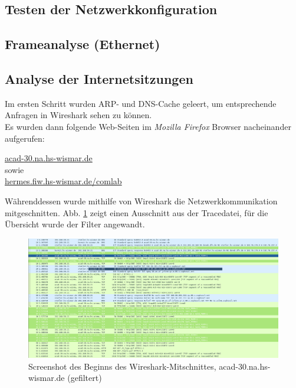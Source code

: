 \documentclass[11pt, a4paper]{article}
\begin{document}
\subsection{Testen der Netzwerkkonfiguration}


\subsection{Frameanalyse (Ethernet)}


\subsection{Analyse der Internetsitzungen}

Im ersten Schritt wurden ARP- und DNS-Cache geleert, um entsprechende Anfragen in Wireshark sehen zu können.\\

Es wurden dann folgende Web-Seiten im \emph{Mozilla Firefox} Browser nacheinander aufgerufen:
\begin{center}
  \underline{acad-30.na.hs-wismar.de}\\
  sowie\\
  \underline{hermes.fiw.hs-wismar.de/comlab}
\end{center}

Währenddessen wurde mithilfe von Wireshark die Netzwerkkommunikation mitgeschnitten. Abb. \ref{wire_34} zeigt einen Ausschnitt aus der Tracedatei, für die Übersicht wurde der Filter   angewandt.

\begin{figure}[H]
  \centering
  \includegraphics[width=\textwidth]{graphics/versuch/3_4/wireshark/trace_screenshot}
  \caption{Screenshot des Beginns des Wireshark-Mitschnittes, acad-30.na.hs-wismar.de (gefiltert)}\label{wire_34}
\end{figure}
\end{document}

